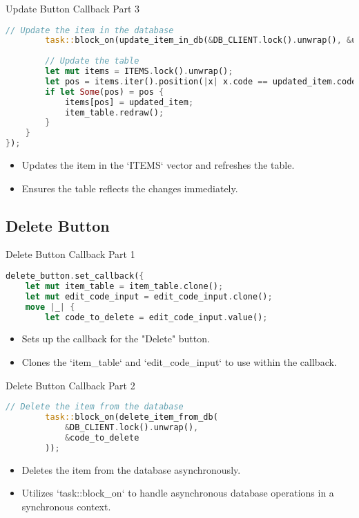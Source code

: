 \documentclass[aspectratio=169, table]{beamer}
\begin{document}
\begin{frame}[fragile]{Update Button Callback Part 3}
	\vspace{15pt}
	\begin{lstlisting}[language=Rust]
		// Update the item in the database
		task::block_on(update_item_in_db(&DB_CLIENT.lock().unwrap(), &updated_item));
		
		// Update the table
		let mut items = ITEMS.lock().unwrap();
		let pos = items.iter().position(|x| x.code == updated_item.code);
		if let Some(pos) = pos {
			items[pos] = updated_item;
			item_table.redraw();
		}
	}
});
\end{lstlisting}
\begin{itemize}
\item Updates the item in the `ITEMS` vector and refreshes the table.
\item Ensures the table reflects the changes immediately.
\end{itemize}
\end{frame}

\subsection{Delete Button}
\begin{frame}[fragile]{Delete Button Callback Part 1}
\begin{lstlisting}[language=Rust]
delete_button.set_callback({
	let mut item_table = item_table.clone();
	let mut edit_code_input = edit_code_input.clone();
	move |_| {
		let code_to_delete = edit_code_input.value();
	\end{lstlisting}
	
	\begin{itemize}
		\item Sets up the callback for the "Delete" button.
		\item Clones the `item\_table` and `edit\_code\_input` to use within the callback.
	\end{itemize}
\end{frame}

\begin{frame}[fragile]{Delete Button Callback Part 2}
	\begin{lstlisting}[language=Rust]
		// Delete the item from the database
		task::block_on(delete_item_from_db(
			&DB_CLIENT.lock().unwrap(),
			&code_to_delete
		));
	\end{lstlisting}
	
	\begin{itemize}
		\item Deletes the item from the database asynchronously.
		\item Utilizes `task::block\_on` to handle asynchronous database operations in a synchronous context.
	\end{itemize}
\end{frame}
\end{document}
